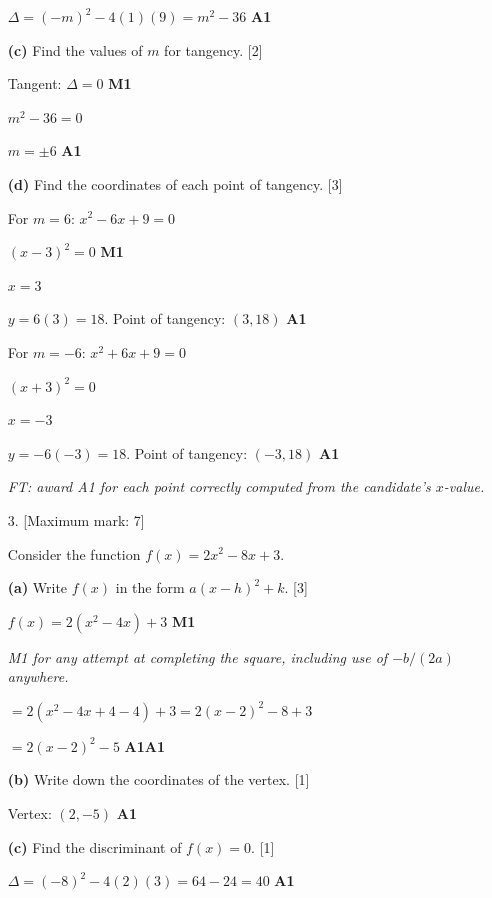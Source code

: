 \documentclass[12pt, twoside]{article}
\begin{document}
\begin{enumerate}[itemsep=0.3cm]
$\Delta = (-m)^2 - 4(1)(9) = m^2 - 36$ \hfill \textbf{A1}

\medskip

\textbf{(c)} Find the values of $m$ for tangency. \hfill [2]

Tangent: $\Delta = 0$ \hfill \textbf{M1}

$m^2 - 36 = 0$

$m = \pm 6$ \hfill \textbf{A1}

\medskip

\textbf{(d)} Find the coordinates of each point of tangency. \hfill [3]

For $m = 6$: $x^2 - 6x + 9 = 0$

$(x - 3)^2 = 0$ \hfill \textbf{M1}

$x = 3$

$y = 6(3) = 18$. \quad Point of tangency: $(3, 18)$ \hfill \textbf{A1}

For $m = -6$: $x^2 + 6x + 9 = 0$

$(x + 3)^2 = 0$

$x = -3$

$y = -6(-3) = 18$. \quad Point of tangency: $(-3, 18)$ \hfill \textbf{A1}

\emph{FT: award A1 for each point correctly computed from the candidate's $x$-value.}

\newpage

\item[3.] [Maximum mark: 7]

Consider the function $f(x) = 2x^2 - 8x + 3$.

\medskip

\textbf{(a)} Write $f(x)$ in the form $a(x - h)^2 + k$. \hfill [3]

$f(x) = 2(x^2 - 4x) + 3$ \hfill \textbf{M1}

\emph{M1 for any attempt at completing the square, including use of $-b/(2a)$ anywhere.}

$= 2(x^2 - 4x + 4 - 4) + 3 = 2(x - 2)^2 - 8 + 3$

$= 2(x - 2)^2 - 5$ \hfill \textbf{A1A1}

\medskip

\textbf{(b)} Write down the coordinates of the vertex. \hfill [1]

Vertex: $(2, -5)$ \hfill \textbf{A1}

\medskip

\textbf{(c)} Find the discriminant of $f(x) = 0$. \hfill [1]

$\Delta = (-8)^2 - 4(2)(3) = 64 - 24 = 40$ \hfill \textbf{A1}


\end{enumerate}
\end{document}

